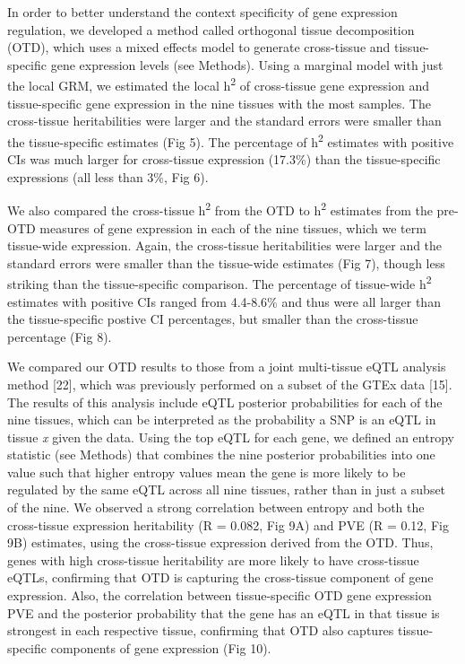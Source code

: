 \documentclass[]{article}
\begin{document}
In order to better understand the context specificity of gene expression
regulation, we developed a method called orthogonal tissue decomposition
(OTD), which uses a mixed effects model to generate cross-tissue and
tissue-specific gene expression levels (see Methods). Using a marginal
model with just the local GRM, we estimated the local
h\textsuperscript{2} of cross-tissue gene expression and tissue-specific
gene expression in the nine tissues with the most samples. The
cross-tissue heritabilities were larger and the standard errors were
smaller than the tissue-specific estimates (Fig 5). The percentage of
h\textsuperscript{2} estimates with positive CIs was much larger for
cross-tissue expression (17.3\%) than the tissue-specific expressions
(all less than 3\%, Fig 6).

We also compared the cross-tissue h\textsuperscript{2} from the OTD to
h\textsuperscript{2} estimates from the pre-OTD measures of gene
expression in each of the nine tissues, which we term tissue-wide
expression. Again, the cross-tissue heritabilities were larger and the
standard errors were smaller than the tissue-wide estimates (Fig 7),
though less striking than the tissue-specific comparison. The percentage
of tissue-wide h\textsuperscript{2} estimates with positive CIs ranged
from 4.4-8.6\% and thus were all larger than the tissue-specific postive
CI percentages, but smaller than the cross-tissue percentage (Fig 8).

We compared our OTD results to those from a joint multi-tissue eQTL
analysis method {[}22{]}, which was previously performed on a subset of
the GTEx data {[}15{]}. The results of this analysis include eQTL
posterior probabilities for each of the nine tissues, which can be
interpreted as the probability a SNP is an eQTL in tissue \emph{x} given
the data. Using the top eQTL for each gene, we defined an entropy
statistic (see Methods) that combines the nine posterior probabilities
into one value such that higher entropy values mean the gene is more
likely to be regulated by the same eQTL across all nine tissues, rather
than in just a subset of the nine. We observed a strong correlation
between entropy and both the cross-tissue expression heritability (R =
0.082, Fig 9A) and PVE (R = 0.12, Fig 9B) estimates, using the
cross-tissue expression derived from the OTD. Thus, genes with high
cross-tissue heritability are more likely to have cross-tissue eQTLs,
confirming that OTD is capturing the cross-tissue component of gene
expression. Also, the correlation between tissue-specific OTD gene
expression PVE and the posterior probability that the gene has an eQTL
in that tissue is strongest in each respective tissue, confirming that
OTD also captures tissue-specific components of gene expression (Fig
10).
\end{document}

